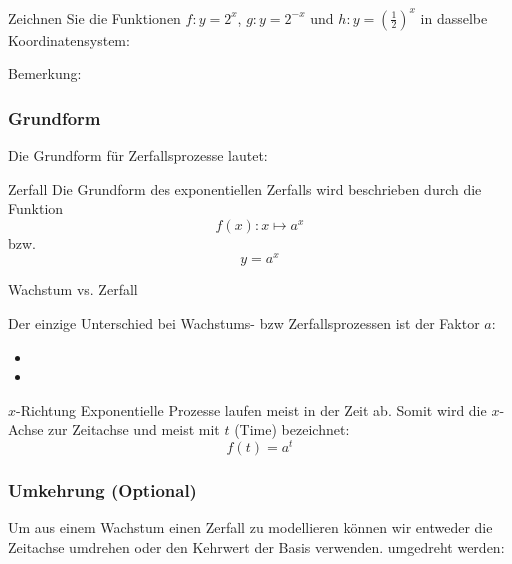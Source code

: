 \newpage



Zeichnen Sie die Funktionen $f: y=2^x$, $g: y=2^{-x}$ und $h: y=\left(\frac12\right)^x$ in dasselbe Koordinatensystem:


Bemerkung: 
\newpage

\subsubsection{Grundform} 
Die Grundform für Zerfallsprozesse lautet:

\begin{definition}{Zerfall}{}
  Die Grundform des exponentiellen Zerfalls wird beschrieben durch die Funktion
$$f(x): x \mapsto a^x$$
  bzw.
  $$y = a^x$$
\end{definition}


\begin{gesetz}{Wachstum vs. Zerfall}{}

  Der einzige Unterschied bei Wachstums- bzw Zerfallsprozessen ist der
  Faktor $a$:

  \begin{itemize}
    \item {}\vspace{3mm}
    \item {}
  \end{itemize}
  
\end{gesetz}

\begin{bemerkung}{$x$-Richtung}{}
  Exponentielle Prozesse laufen meist in der Zeit ab. Somit wird
  die $x$-Achse zur Zeitachse und meist mit $t$ (Time) bezeichnet:
  $$f(t) = a^t$$
  \end{bemerkung}


\subsubsection{Umkehrung (Optional)}
Um aus einem Wachstum einen Zerfall zu modellieren können wir entweder
die Zeitachse umdrehen oder den Kehrwert der Basis verwenden.
umgedreht werden:

